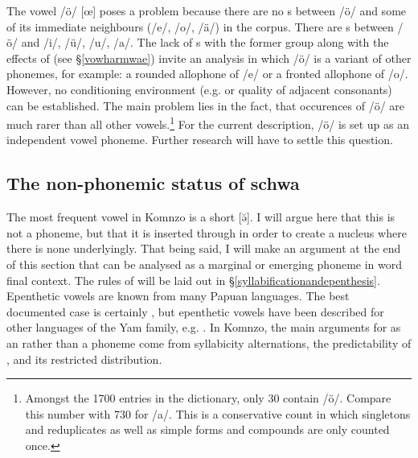 The vowel /ö/ [œ] poses a problem because there are no s between /ö/ and some of its immediate neighbours (/e/, /o/, /ä/) in the corpus. There are s between /ö/ and /i/, /ü/, /u/, /a/. The lack of s with the former group along with the effects of  (see \S{}\ref{vowharmwae}) invite an analysis in which /ö/ is a variant of other phonemes, for example: a rounded allophone of /e/ or a fronted allophone of /o/. However, no conditioning environment (e.g.  or quality of adjacent consonants) can be established. The main problem lies in the fact, that occurences of /ö/ are much rarer than all other vowels.\footnote{Amongst the 1700 entries in the dictionary, only 30 contain /ö/. Compare this number with 730 for /a/. This is a conservative count in which singletons and reduplicates as well as simple forms and compounds are only counted once.} For the current description, /ö/ is set up as an independent vowel phoneme. Further research will have to settle this question.
\vspace{-.2cm}

\subsection{The non-phonemic status of schwa} \label{schwa-as-non-phoneme}

The most frequent vowel in Komnzo is a short  [ə̆]. I will argue here that this is not a phoneme, but that it is inserted through  in order to create a  nucleus where there is none underlyingly. That being said, I will make an argument at the end of this section that  can be analysed as a marginal or emerging phoneme in word final context. The rules of  will be laid out in \S{}\ref{syllabificationandepenthesis}.\\

Epenthetic vowels are known from many Papuan languages. The best documented case is certainly  \citep{Biggs:1963wk, Pawley:1966wj, Blevins:2010ee}, but epenthetic vowels have been described for other languages of the Yam family, e.g.  \citep{Evans:ji}. In Komnzo, the main arguments for  as an  rather than a phoneme come from syllabicity alternations, the predictability of , and its restricted distribution.\\

